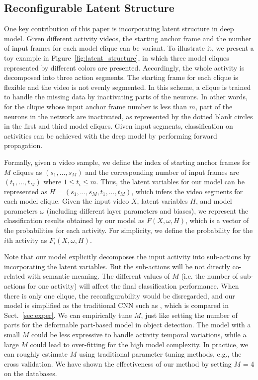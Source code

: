 \documentclass{sig-alternate}
\begin{document}
\subsection{Reconfigurable Latent Structure}

One key contribution of this paper is incorporating latent structure in deep model. Given different activity videos, the starting anchor frame and the number of input frames for each model clique can be variant. To illustrate it, we present a toy example in Figure~\ref{fig:latent_structure}, in which three model cliques represented by different colors are presented. Accordingly, the whole activity is decomposed into three action segments. The starting frame for each clique is flexible and the video is not evenly segmented. In this scheme, a clique is trained to handle the missing data by inactivating parts of the neurons. In other words, for the clique whose input anchor frame number is less than $m$, part of the neurons in the network are inactivated, as represented by the dotted blank circles in the first and third model cliques. Given input segments, classification on activities can be achieved with the deep model by performing forward propagation.

Formally, given a video sample, we define the index of starting anchor frames for $M$ cliques as $(s_1,...,s_M)$ and the corresponding number of input frames are $(t_1,...,t_M)$ where $1 \leq t_i \leq m$. Thus, the latent variables for our model can be represented as $H=(s_1,...,s_M, t_1,...,t_M)$, which infers the video segments for each model clique. Given the input video $X$, latent variables $H$, and model parameters $\omega$ (including different layer parameters and biases), we represent the classification results obtained by our model as $F(X,\omega,H)$, which is a vector of the probabilities for each activity. For simplicity, we define the probability for the $i$th activity as $F_i(X,\omega,H)$.

Note that our model explicitly decomposes the input activity into sub-actions by incorporating the latent variables. But the sub-actions will be not directly co-related with semantic meaning. The different values of $M$ (i.e. the number of sub-actions for one activity) will affect the final classification performance. 
When there is only one clique, the reconfigurability would be disregarded, and our model is simplified as the traditional CNN such as \cite{3DCNNPAMI}, which is compared in Sect.~\ref{sec:exper}. We can empirically tune $M$, just like setting the number of parts for the deformable part-based model in object detection. The model with a small $M$ could be less expressive to handle activity temporal variations, while a large $M$ could lead to over-fitting for the high model complexity. In practice, we can roughly estimate $M$ using traditional parameter tuning methods, e.g., the cross validation. We have shown the effectiveness of our method by setting $M$ = 4 on the databases. 
\end{document}

